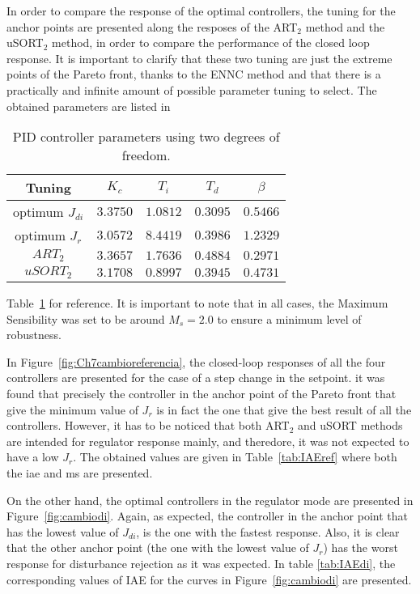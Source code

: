 In order to compare the response of the optimal controllers, the tuning for the anchor points are presented along the resposes of the ART$_2$ method \citep{Vilanova2011} and the uSORT$_2$ method\citep{Alfaro2012a}, in order to compare the performance of the closed loop response. It is important to clarify that these two tuning are just the extreme points of the Pareto front, thanks to the ENNC method and that there is a practically and infinite amount of possible parameter tuning to select. The obtained parameters are listed in %
%
\begin{table}[tb]
	\caption{PID controller parameters using two degrees of freedom.}
	\centering
	\begin{tabular}{@{}*{5}{c}@{}}
		\toprule
		Tuning              &$K_c$       &$T_i$      &$T_d$     & $\beta$ 	\\
		\midrule              
		optimum $J_{di}$     &$3.3750$   & $1.0812$  &$0.3095$  &$0.5466$   \\
		optimum $J_{r}$      &$3.0572$   & $8.4419$  &$0.3986$  &$1.2329$   \\
		$ART_2$             &$3.3657$   & $1.7636$  &$0.4884$  &$0.2971$   \\
		$uSORT_2$           &$3.1708$   & $0.8997$  &$0.3945$  &$0.4731$   \\	
		\bottomrule				
	\end{tabular}
	\label{tab:parametroscontrolador}
\end{table}
%
Table~\ref{tab:parametroscontrolador} for reference. It is important to note that in all cases, the Maximum Sensibility was set to be around $M_s = 2.0$ to ensure a minimum level of robustness.

In Figure~\ref{fig:Ch7cambioreferencia}, the closed-loop responses of all the four controllers are presented for the case of a step change in the setpoint. it was found that precisely the controller in the anchor point of the Pareto front that give the minimum value of $J_r$ is in fact the one that give the best result of all the controllers. However, it has to be noticed that both ART$_2$ and uSORT methods are intended for regulator response mainly, and theredore, it was not expected to have a low $J_r$. The obtained values are given in Table~\ref{tab:IAEref} where both the \gls{iae} and \gls{ms} are presented. 

On the other hand, the optimal controllers in the regulator mode are presented in Figure~\ref{fig:cambiodi}. Again, as expected, the controller in the anchor point that has the lowest value of $J_{di}$, is the one with the fastest response. Also, it is clear that the other anchor point (the one with the lowest value of $J_r$) has the worst response for disturbance rejection as it was expected. In table \ref{tab:IAEdi}, the corresponding values of IAE for the curves in Figure~\ref{fig:cambiodi} are presented.

